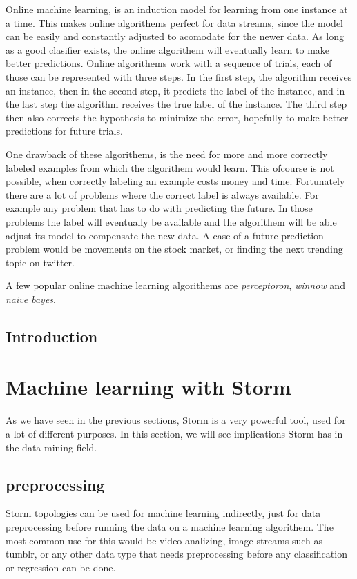 \documentclass[journal]{IEEEtran/IEEEtran}
\begin{document}
Online machine learning, is an induction model for learning from one instance at a time. This makes online algorithems perfect for data streams, since the model can be easily and constantly adjusted to acomodate for the newer data. As long as a good clasifier exists, the online algorithem will eventually learn to make better predictions. Online algorithems work with a sequence of trials, each of those can be represented with three steps. In the first step, the algorithm receives an instance, then in the second step, it predicts the label of the instance, and in the last step the algorithm receives the true label of the instance. The third step then also corrects the hypothesis to minimize the error, hopefully to make better predictions for future trials. 

One drawback of these algorithems, is the need for more and more correctly labeled examples from which the algorithem would learn. This ofcourse is not possible, when correctly labeling an example costs money and time. Fortunately there are a lot of problems where the correct label is always available. For example any problem that has to do with predicting the future. In those problems the label will eventually be available and the algorithem will be able adjust its model to compensate the new data. A case of a future prediction problem would be movements on the stock market, or finding the next trending topic on twitter.

A few popular online machine learning algorithems are \textit{perceptoron}, \textit{winnow} and \textit{naive bayes}. 

\subsection{Introduction}

\section{Machine learning with Storm}

As we have seen in the previous sections, Storm is a very powerful tool, used for a lot of different purposes. In this section, we will see implications Storm has in the data mining field. 

\subsection{preprocessing}
Storm topologies can be used for machine learning indirectly, just for data preprocessing before running the data on a machine learning algorithem. The most common use for this would be video analizing, image streams such as tumblr, or any other data type that needs preprocessing before any classification or regression can be done.
\end{document}

